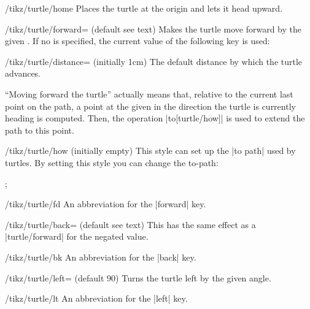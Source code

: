 \begin{key}{/tikz/turtle/home}
    Places the turtle at the origin and lets it head upward.
\end{key}

\begin{key}{/tikz/turtle/forward= (default \normalfont see text)}
    Makes the turtle move forward by the given . If no
     is specified, the current value of the following key is
    used:
    \begin{key}{/tikz/turtle/distance= (initially 1cm)}
        The default distance by which the turtle advances.
    \end{key}
    ``Moving forward the turtle'' actually means that, relative to the current
    last point on the path, a point at the given  in the
    direction the turtle is currently heading is computed. Then, the operation
    |to[turtle/how]| is used to extend the path to this point.
    \begin{stylekey}{/tikz/turtle/how (initially \normalfont empty)}
        This style can set up the |to path| used by turtles. By setting this
        style you can change the to-path:
\begin{codeexample}[]
\tikz \draw [turtle={how/.style={bend left},home,forward,right,forward}];
\end{codeexample}
    \end{stylekey}
\end{key}

\begin{key}{/tikz/turtle/fd}
    An abbreviation for the |forward| key.
\end{key}

\begin{key}{/tikz/turtle/back= (default \normalfont see text)}
    This has the same effect as a |turtle/forward| for the negated
     value.
\end{key}

\begin{key}{/tikz/turtle/bk}
    An abbreviation for the |back| key.
\end{key}

\begin{key}{/tikz/turtle/left= (default 90)}
    Turns the turtle left by the given angle.
\end{key}

\begin{key}{/tikz/turtle/lt}
    An abbreviation for the |left| key.
\end{key}

